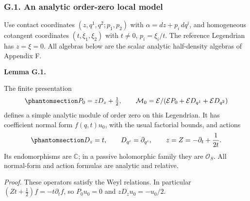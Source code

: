 \documentclass[
  english,
  11pt,
  reqno]{amsart}
\makeatletter
\newcommand{\pandocstatementheading}[1]{%
  \par\addpenalty{\@beginparpenalty}%
  \addvspace{.5\baselineskip plus .2\baselineskip minus .2\baselineskip}%
  {\normalfont\bfseries #1\par}%
  \nobreak\@afterindenttrue\@afterheading
}
\makeatother
\begin{document}
\protect{}\label{sec:gg-module-standard-model}

\subsubsection{G.1. An analytic order-zero local
model}\label{g.1.-an-analytic-order-zero-local-model}

Use contact coordinates \((z,q^1,q^2;p_1,p_2)\) with
\(\alpha=dz+p_i\,dq^i\), and homogeneous cotangent coordinates
\((t,\xi_1,\xi_2)\) with \(t\ne0\), \(p_i=\xi_i/t\). The reference
Legendrian has \(z=\xi=0\). All algebras below are the scalar analytic
half-density algebras of Appendix F.

\pandocstatementheading{\protect{}\label{lem:gg-module-standard-model}Lemma G.1.}

The finite presentation
\begin{equation}\protect\phantomsection\label{eq:gg-module-standard-presentation}{
 P_0=zD_z+\tfrac12,\qquad
 \mathcal M_0=\mathcal E/
       (\mathcal E P_0+\mathcal E D_{q^1}+\mathcal E D_{q^2})
}\end{equation} defines a simple analytic module of order zero on this
Legendrian. It has coefficient normal form \(f(q,t)u_0\), with the usual
factorial bounds, and actions
\begin{equation}\protect\phantomsection\label{eq:gg-module-standard-action}{
 D_z=t,\qquad D_{q^i}=\partial_{q^i},\qquad
 z=Z=-\partial_t+\frac1{2t}.
}\end{equation} Its endomorphisms are \(\mathbb C\); in a passive
holomorphic family they are \(\mathcal O_S\). All normal-form and action
formulas are analytic and relative.

\emph{Proof.} These operators satisfy the Weyl relations. In particular
\((Zt+\tfrac12)f=-t\partial_t f\), so \(P_0u_0=0\) and
\(zD_zu_0=-u_0/2\).
\end{document}
